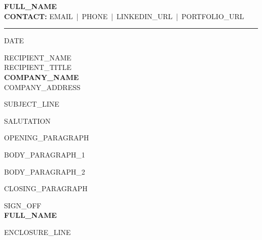 \documentclass[a4paper,11pt]{article}
\begin{document}
\begin{flushleft}
  {\Huge \textbf{{{FULL_NAME}}}}\\[4pt]
  \textbf{CONTACT:} {{EMAIL}} \,|\, {{PHONE}} \,|\, {{LINKEDIN_URL}} \,|\, {{PORTFOLIO_URL}}
\end{flushleft}
\rule{\textwidth}{1.5pt}

\vspace{1em}
{{DATE}}

\vspace{1em}
{{RECIPIENT_NAME}}\\
{{RECIPIENT_TITLE}}\\
\textbf{{{COMPANY_NAME}}}\\
{{COMPANY_ADDRESS}}

\vspace{1.5em}
{{SUBJECT_LINE}}

\vspace{1em}
{{SALUTATION}}

{{OPENING_PARAGRAPH}}

{{BODY_PARAGRAPH_1}}

{{BODY_PARAGRAPH_2}}

{{CLOSING_PARAGRAPH}}

\vspace{2em}
{{SIGN_OFF}}\\[2.5em]
\textbf{{{FULL_NAME}}}

\vspace{2em}
{{ENCLOSURE_LINE}}
\end{document}
